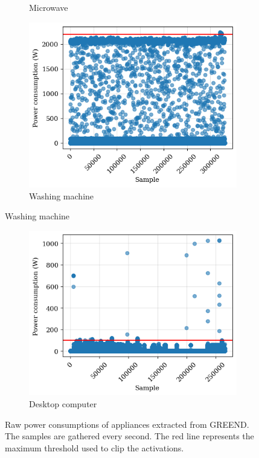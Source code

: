 \begin{figure}
\begin{subfigure}{.5\textwidth}
    \caption{Microwave}
    \label{fig:microwave}
  \end{subfigure}%
  \begin{subfigure}{.5\textwidth}
    \centering
    \includegraphics[width=.9\linewidth]{images/raw_consumptions/washing_machine.png}
    \caption{Washing machine}
    \label{fig:washing_machine}
  \end{subfigure}
\end{figure}%
\begin{figure}\ContinuedFloat
  \begin{subfigure}{\textwidth}
    \centering
    \includegraphics[width=.45\linewidth]{images/raw_consumptions/desktop_computer.png}
    \caption{Desktop computer}
    \label{fig:desktop_computer}
  \end{subfigure}
  \caption[Raw power consumptions of appliances extracted from GREEND]{Raw power consumptions of appliances extracted from GREEND. The samples are gathered every second. The red line represents the maximum threshold used to clip the activations.}
  \label{fig:raw_power_consumptions_greend}
\end{figure}

